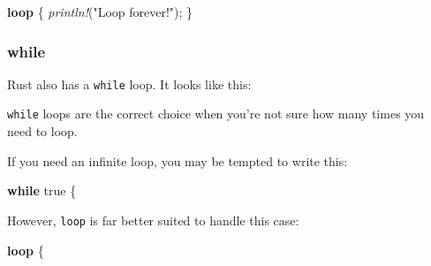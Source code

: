\documentclass[a4paper,]{book}
\newenvironment{Shaded}{\begin{snugshade}}{\end{snugshade}}
\newcommand{\KeywordTok}[1]{\textcolor[rgb]{0.13,0.29,0.53}{\textbf{{#1}}}}
\newcommand{\DecValTok}[1]{\textcolor[rgb]{0.00,0.00,0.81}{{#1}}}
\newcommand{\ConstantTok}[1]{\textcolor[rgb]{0.00,0.00,0.00}{{#1}}}
\newcommand{\StringTok}[1]{\textcolor[rgb]{0.31,0.60,0.02}{{#1}}}
\newcommand{\CommentTok}[1]{\textcolor[rgb]{0.56,0.35,0.01}{\textit{{#1}}}}
\newcommand{\PreprocessorTok}[1]{\textcolor[rgb]{0.56,0.35,0.01}{\textit{{#1}}}}
\newcommand{\NormalTok}[1]{{#1}}
\begin{document}
\begin{Shaded}
\begin{Highlighting}[]
\KeywordTok{loop} \NormalTok{\{}
    \PreprocessorTok{println!}\NormalTok{(}\StringTok{"Loop forever!"}\NormalTok{);}
\NormalTok{\}}
\end{Highlighting}
\end{Shaded}

\subsubsection{while}\label{while}

Rust also has a \texttt{while} loop. It looks like this:

\begin{Shaded}
\end{Shaded}

\texttt{while} loops are the correct choice when you're not sure how
many times you need to loop.

If you need an infinite loop, you may be tempted to write this:

\begin{Shaded}
\begin{Highlighting}[]
\KeywordTok{while} \ConstantTok{true} \NormalTok{\{}
\end{Highlighting}
\end{Shaded}

However, \texttt{loop} is far better suited to handle this case:

\begin{Shaded}
\begin{Highlighting}[]
\KeywordTok{loop} \NormalTok{\{}
\end{Highlighting}
\end{Shaded}
\end{document}
